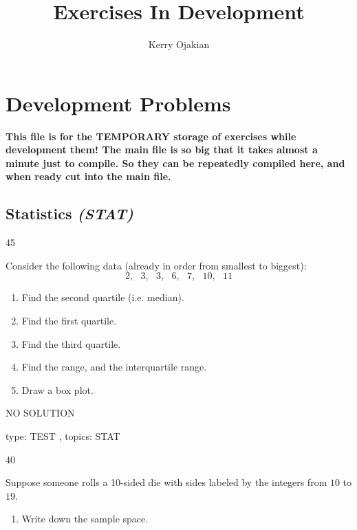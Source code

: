 \documentclass[12 pt]{article}
\title {\bf Exercises In Development}
\author {Kerry Ojakian}
\newcommand{\topic}[1]{ {\bf \textit{(#1)}} }
\begin{document}
\maketitle


\tableofcontents
\newpage

\section{Development Problems}

{\bf This file is for the TEMPORARY storage of exercises while development them!  The main file is so big that it takes almost a minute just to compile.  So they can be repeatedly compiled here, and when ready cut into the main file. }


\begin{itemize}


\section{Statistics \topic{STAT}}


\ex
{}{45}
{
Consider the following data (already in order from smallest to biggest):
$$2, \ \ \  3,  \ \ \  3,  \ \ \  6,  \ \ \  7,  \ \ \  10, \ \ \  11$$

\begin{enumerate}

\item
Find the second quartile (i.e. median). 

\item
Find the first quartile.  

\item
Find the third quartile.

\item
Find the range, and the interquartile range.

\item
Draw a box plot.

\end{enumerate}

}
{
NO SOLUTION

}{}{type: TEST , topics: STAT}



 \ex
{}{40}
{  
Suppose someone rolls a 10-sided die with sides labeled by the integers from $10$ to $19$.

\begin{enumerate}

\item Write down the sample space.


\end{enumerate}}
\end{itemize}
\end{document}
